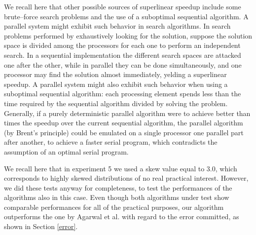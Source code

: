 \documentclass[final,3p,times]{elsarticle}
\begin{document}
We recall here that other possible sources of superlinear speedup include some brute--force search problems and the use of a suboptimal sequential algorithm. A parallel system
might exhibit such behavior in search algorithms. In search problems performed by exhaustively looking for the solution, suppose the solution space is divided among the
processors for each one to perform an independent search. In a sequential  implementation the different search spaces are attacked one after the other, while in parallel they
can be done simultaneously, and one processor may find the solution almost immediately, yelding a superlinear speedup.
A parallel system might also exhibit such behavior when using a suboptimal sequential algorithm: each processing element spends less than the time required by the sequential
algorithm divided by   solving the problem. Generally, if a purely deterministic parallel algorithm were to achieve  better than  times the speedup over the current
sequential algorithm, the parallel algorithm (by Brent's principle) could be emulated on a single processor one parallel part after another, to achieve a faster serial program,
which contradicts the assumption of an optimal serial program.


We recall here that in experiment 5 we used a skew value equal to 3.0, which corresponds to highly skewed distributions of no real practical interest. However, we did these tests anyway for completeness, to test the performances of the algorithms also in this case. Even though both algorithms under test show comparable performances for all of the practical purposes, our algorithm outperforms the one by Agarwal et al. with regard to the error committed, as shown in Section \ref{error}.






\end{document}
